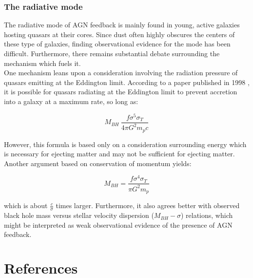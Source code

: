 \documentclass[a4paper]{article}
\begin{document}
        \subsubsection{The radiative mode}
        
            The radiative mode of AGN feedback is mainly found in young, active galaxies hosting quasars at their cores. Since dust often highly obscures the centers of these type of galaxies, finding observational evidence for the mode has been difficult. Furthermore, there remains substantial debate surrounding the mechanism which fuels it. \\
            One mechanism leans upon a consideration involving the radiation pressure of quasars emitting at the Eddington limit. According to a paper published in 1998 \citep{Silk1998}, it is possible for quasars radiating at the Eddington limit to prevent accretion into a galaxy at a maximum rate, so long as:
            
            \begin{equation}
                M_{BH} ~ \frac{f \sigma^5 \sigma_T}{4\pi G^2 m_p c}
            \end{equation}
            
            However, this formula is based only on a consideration surrounding energy which is necessary for ejecting matter and may not be sufficient for ejecting matter. Another argument based on conservation of momentum yields:
            
            \begin{equation}
                M_{BH} = \frac{f \sigma^4 \sigma_T}{\pi G^2 m_p}
            \end{equation}
            
            which is about $\frac{c}{\sigma}$ times larger. Furthermore, it also agrees better with observed black hole mass versus stellar velocity dispersion ($M_{BH} - \sigma$) relations, which might be interpreted as weak observational evidence of the presence of AGN feedback. \\
            
            
            
            
            
            
            
            
            






%

\clearpage
\section{References}
\renewcommand\refname{}


\end{document}
